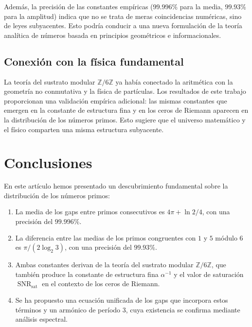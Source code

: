 \documentclass[12pt,a4paper]{article}
\theoremstyle{plain}
\theoremstyle{definition}
\theoremstyle{remark}
\newcommand{\Zmod}{\mathbb{Z}/6\mathbb{Z}}
\newcommand{\SNR}{\operatorname{SNR}}
\newcommand{\SNRsat}{\SNR_{\text{sat}}}
\begin{document}
Además, la precisión de las constantes empíricas ($99.996\%$ para la media, $99.93\%$ para la amplitud) indica que no se trata de meras coincidencias numéricas, sino de leyes subyacentes. Esto podría conducir a una nueva formulación de la teoría analítica de números basada en principios geométricos e informacionales.

\subsection{Conexión con la física fundamental}

La teoría del sustrato modular $\Zmod$ ya había conectado la aritmética con la geometría no conmutativa y la física de partículas. Los resultados de este trabajo proporcionan una validación empírica adicional: las mismas constantes que emergen en la constante de estructura fina y en los ceros de Riemann aparecen en la distribución de los números primos. Esto sugiere que el universo matemático y el físico comparten una misma estructura subyacente.

\section{Conclusiones}

En este artículo hemos presentado un descubrimiento fundamental sobre la distribución de los números primos:

\begin{enumerate}
\item La media de los gaps entre primos consecutivos es $4\pi + \ln 2/4$, con una precisión del $99.996\%$.
\item La diferencia entre las medias de los primos congruentes con $1$ y $5$ módulo $6$ es $\pi/(2\log_2 3)$, con una precisión del $99.93\%$.
\item Ambas constantes derivan de la teoría del sustrato modular $\Zmod$, que también produce la constante de estructura fina $\alpha^{-1}$ y el valor de saturación $\SNRsat$ en el contexto de los ceros de Riemann.
\item Se ha propuesto una ecuación unificada de los gaps que incorpora estos términos y un armónico de período 3, cuya existencia se confirma mediante análisis espectral.
\end{enumerate}
\end{document}
